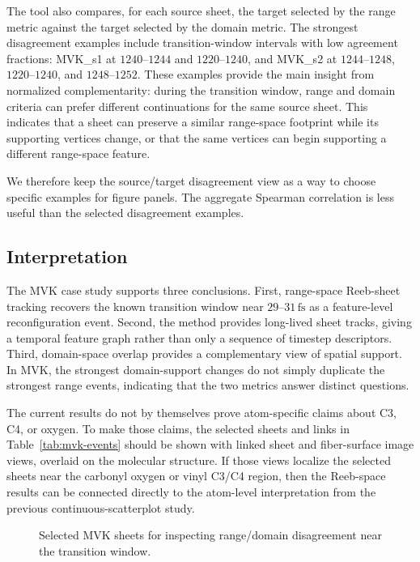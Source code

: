 The tool also compares, for each source sheet, the target selected by the range
metric against the target selected by the domain metric. The strongest
disagreement examples include transition-window intervals with low agreement
fractions: MVK\_s1 at \(1240\)--\(1244\) and \(1220\)--\(1240\), and MVK\_s2 at
\(1244\)--\(1248\), \(1220\)--\(1240\), and \(1248\)--\(1252\). These examples
provide the main insight from normalized complementarity: during the transition
window, range and domain criteria can prefer different continuations for the
same source sheet. This indicates that a sheet can preserve a similar
range-space footprint while its supporting vertices change, or that the same
vertices can begin supporting a different range-space feature.

We therefore keep the source/target disagreement view as a way to choose
specific examples for figure panels. The aggregate Spearman correlation is less
useful than the selected disagreement examples.

\subsection{Interpretation}

The MVK case study supports three conclusions. First, range-space Reeb-sheet
tracking recovers the known transition window near \(29\)--\(31\,\mathrm{fs}\)
as a feature-level reconfiguration event. Second, the method provides
long-lived sheet tracks, giving a temporal feature graph rather than only a
sequence of timestep descriptors. Third, domain-space overlap provides a
complementary view of spatial support. In MVK, the strongest domain-support
changes do not simply duplicate the strongest range events, indicating that the
two metrics answer distinct questions.

The current results do not by themselves prove atom-specific claims about C3,
C4, or oxygen. To make those claims, the selected sheets and links in
Table~\ref{tab:mvk-events} should be shown with linked sheet and fiber-surface
image views, overlaid on the molecular structure. If those views localize the
selected sheets near the carbonyl oxygen or vinyl C3/C4 region, then the
Reeb-space results can be connected directly to the atom-level interpretation
from the previous continuous-scatterplot study.

\begin{figure}[t]
  \centering
  \caption{Selected MVK sheets for inspecting range/domain disagreement near
  the transition window.}
  \label{fig:mvk-detail-views}
\end{figure}
